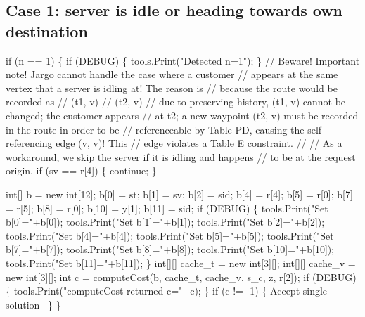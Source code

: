 \documentclass{article}
\def\nwendcode{\endtrivlist \endgroup}      %
\let\nwdocspar=\par
\begin{document}
\subsection{Case 1: server is idle or heading towards own destination}
\nwenddocs{}\endmoddef{}
if (n == 1) \{
  if (DEBUG) \{
    tools.Print("Detected n=1");
  \}
  // Beware! Important note! Jargo cannot handle the case where a customer
  // appears at the same vertex that a server is idling at! The reason is
  // because the route would be recorded as
  //   (t1, v)
  //   (t2, v)
  // due to preserving history, (t1, v) cannot be changed; the customer appears
  // at t2; a new waypoint (t2, v) must be recorded in the route in order to be
  // referenceable by Table PD, causing the self-referencing edge (v, v)! This
  // edge violates a Table E constraint.
  //
  // As a workaround, we skip the server if it is idling and happens
  // to be at the request origin.
  if (sv == r[4]) \{
    continue;
  \}

  int[] b = new int[12];
  b[0] = st;
  b[1] = sv;
  b[2] = sid;
  b[4] = r[4];
  b[5] = r[0];
  b[7] = r[5];
  b[8] = r[0];
  b[10] = y[1];
  b[11] = sid;
  if (DEBUG) \{
    tools.Print("Set b[0]="+b[0]);
    tools.Print("Set b[1]="+b[1]);
    tools.Print("Set b[2]="+b[2]);
    tools.Print("Set b[4]="+b[4]);
    tools.Print("Set b[5]="+b[5]);
    tools.Print("Set b[7]="+b[7]);
    tools.Print("Set b[8]="+b[8]);
    tools.Print("Set b[10]="+b[10]);
    tools.Print("Set b[11]="+b[11]);
  \}
  int[][] cache_t = new int[3][];
  int[][] cache_v = new int[3][];
  int c = computeCost(b, cache_t, cache_v, s_c, z, r[2]);
  if (DEBUG) \{
    tools.Print("computeCost returned c="+c);
  \}
  if (c != -1) \{
    \LA{}Accept single solution~{\nwtagstyle{}}\RA{}
  \}
\}
\nwendcode{}\nwdocspar
\end{document}
